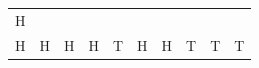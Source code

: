 {\begin{tabular}[t]{|l|l|l|l|l|l|l|l|l|l|}
        H%
     \tabularnewline\cline{1-1}\cline{2-2}\cline{3-3}\cline{4-4}\cline{5-5}\cline{6-6}\cline{7-7}\cline{8-8}\cline{9-9}\cline{10-10}
        H &
        H &
        H &
        H &
        T &
        H &
        H &
        T &
        T &
        T%
     \tabularnewline\cline{1-1}\cline{2-2}\cline{3-3}\cline{4-4}\cline{5-5}\cline{6-6}\cline{7-7}\cline{8-8}\cline{9-9}\cline{10-10}

\end{tabular}}
